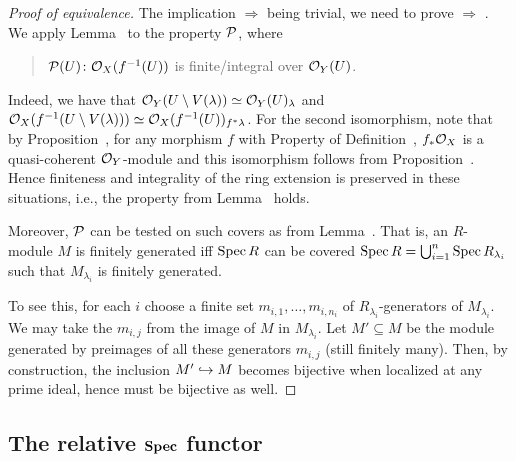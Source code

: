 \documentclass[a4paper,parskip=half,numbers=enddot, DIV=12]{scrreprt}
\begin{document}
\begin{proof}[Proof of equivalence]
	The implication  $\Rightarrow$  being trivial, we need to prove  $\Rightarrow$ . We apply Lemma~ to the property $\mathcal{P}$, where
	\begin{quote}
		$\mathcal{P}(U)\colon\mathcal{O}_X(f^{-1}(U))$ is finite/integral over $\mathcal{O}_Y(U)$.
	\end{quote}
	Indeed, we have that $\mathcal{O}_Y(U\setminus V(\lambda))\simeq \mathcal{O}_Y(U)_\lambda$ and $\mathcal{O}_X(f^{-1}(U\setminus V(\lambda))) \simeq \mathcal{O}_X(f^{-1}(U))_{f^*\lambda}$. For the second isomorphism, note that by Proposition~, for any morphism $f$ with Property  of Definition~, $f_*\mathcal{O}_X$ is a quasi-coherent $\mathcal{O}_Y$-module and this isomorphism follows from Proposition~. Hence finiteness and integrality of the ring extension is preserved in these situations, i.e., the property from Lemma~\itememph{\alpha} holds. 
	
	Moreover, $\mathcal{P}$ can be tested on such covers as from Lemma~\itememph{\beta}. That is, an $R$-module $M$ is finitely generated iff $\operatorname{Spec} R$ can be covered $\operatorname{Spec} R = \bigcup_{i=1}^n \operatorname{Spec} R_{\lambda_i}$ such that $M_{\lambda_i}$ is finitely generated. 
	
	To see this, for each $i$ choose a finite set $m_{i,1},\ldots,m_{i,n_i}$ of $R_{\lambda_i}$-generators of $M_{\lambda_i}$. We may take the $m_{i,j}$ from the image of $M$ in $M_{\lambda_i}$. Let $M'\subseteq M$ be the module generated by preimages of all these generators $m_{i,j}$ (still finitely many). Then, by construction, the inclusion $M'\monomorphism M$ becomes bijective when localized at any prime ideal, hence must be bijective as well.
\end{proof}
\subsection{The relative \texorpdfstring{$\operatorname{\mathbf{Spec}}$}{Spec} functor}
\end{document}
